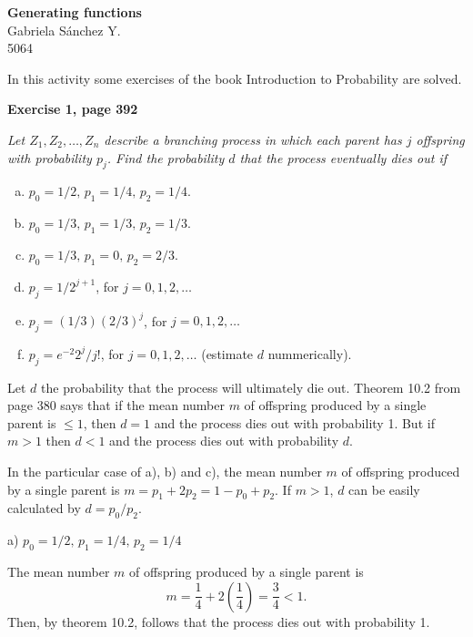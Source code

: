 \documentclass[12pt]{article}
\begin{document}
	\thispagestyle{empty}

	\begin{center}
		{\Large \bf Generating functions}\\
		Gabriela S\'anchez Y.\\
		5064
	\end{center}
  
	In this activity some exercises of the book Introduction to Probability \cite{prob2003} are solved.
	
	{\bf Exercise 1, page 392}
	
	{\em Let $Z_1, Z_2, \ldots, Z_n$ describe a branching process in which each parent has $j$ offspring with pro\-ba\-bi\-li\-ty $p_j$. Find the probability $d$ that the process eventually dies out if 
		\begin{enumerate}[a)]
			\item $p_0 = 1 / 2, \, p_1 = 1 / 4, \, p_2 = 1 / 4$.
			\item $p_0 = 1 / 3, \, p_1 = 1 / 3, \, p_2 = 1 / 3$.
			\item $p_0 = 1 / 3, \, p_1 = 0, \, p_2 = 2 / 3$.
			\item $p_j = 1 / 2^{j + 1}$, for $j = 0, 1, 2, \ldots$
			\item $p_j = (1 / 3) (2/3)^j$, for $j = 0, 1, 2, \ldots$
			\item $p_j = e^{-2} 2^j / j!$, for $j = 0, 1, 2, \ldots$ (estimate $d$ nummerically).
		\end{enumerate}
	}

	Let $d$ the probability that the process will ultimately die out. Theorem 10.2 from page 380 \cite{prob2003} says that if the mean number $m$ of offspring produced by a single parent is $\leq 1$, then $d = 1$ and the process dies out with probability 1. But if $m > 1$ then $d < 1$ and the process dies out with probability $d$.
	
	In the particular case of a), b) and c), the mean number $m$ of offspring produced by a single parent is $m=p_1 + 2p_2 = 1-p_0+p_2$. If $m > 1$, $d$ can be easily calculated by $d= p_0/p_2$. 
	
	\noindent a) $p_0 = 1 / 2, \, p_1 = 1 / 4, \, p_2 = 1 / 4$
	
	The mean number $m$ of offspring produced by a single parent is 
	$$m = \frac{1}{4} + 2\left( \frac{1}{4} \right)= \frac{3}{4} < 1.$$
	Then, by theorem 10.2, follows that the process dies out with probability 1.
	
\end{document}

